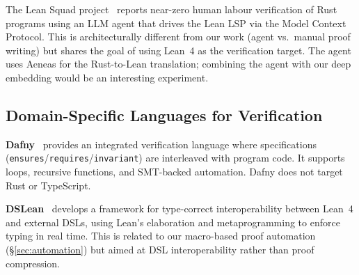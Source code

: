The Lean Squad project~\cite{leansquad2026} reports near-zero human labour
verification of Rust programs using an LLM agent that drives the Lean LSP
via the Model Context Protocol. This is architecturally different from our
work (agent vs.\ manual proof writing) but shares the goal of using Lean~4
as the verification target. The agent uses Aeneas for the Rust-to-Lean
translation; combining the agent with our deep embedding would be an
interesting experiment.

\subsection{Domain-Specific Languages for Verification}

\textbf{Dafny}~\cite{dafny2010} provides an integrated verification language
where specifications (\texttt{ensures}/\texttt{requires}/\texttt{invariant})
are interleaved with program code. It supports loops, recursive functions,
and SMT-backed automation. Dafny does not target Rust or TypeScript.

\textbf{DSLean}~\cite{dslean2026} develops a framework for type-correct
interoperability between Lean~4 and external DSLs, using Lean's elaboration
and metaprogramming to enforce typing in real time. This is related to our
macro-based proof automation (\S\ref{sec:automation}) but aimed at DSL
interoperability rather than proof compression.
